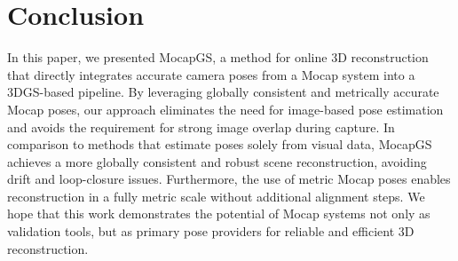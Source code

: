 \documentclass[a4paper,fleqn]{cas-dc}
\begin{document}
\section{Conclusion}\label{sec:conclusion}
In this paper, we presented MocapGS, a method for online 3D reconstruction that directly integrates accurate camera poses from a Mocap system into a 3DGS-based pipeline. By leveraging globally consistent and metrically accurate Mocap poses, our approach eliminates the need for image-based pose estimation and avoids the requirement for strong image overlap during capture. In comparison to methods that estimate poses solely from visual data, MocapGS achieves a more globally consistent and robust scene reconstruction, avoiding drift and loop-closure issues. Furthermore, the use of metric Mocap poses enables reconstruction in a fully metric scale without additional alignment steps. We hope that this work demonstrates the potential of Mocap systems not only as validation tools, but as primary pose providers for reliable and efficient 3D reconstruction.





\end{document}
